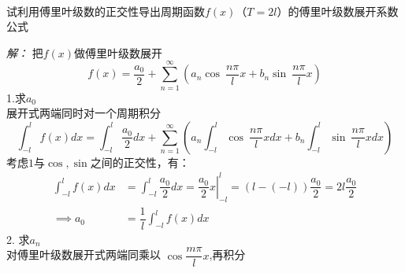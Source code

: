 ~~\\ 
\begin{example}
	试利用傅里叶级数的正交性导出周期函数$f(x)$（$T=2l$）的傅里叶级数展开系数公式
\end{example}
	\emph{解：}
    把$f(x)$做傅里叶级数展开
	$$ f(x) =\dfrac{a_0}{2} +\sum\limits_{n=1}^{\infty}  \left(  a_n \cos~ \dfrac{n\pi}{l} x +  b_n \sin~ \dfrac{n\pi}{l} x  \right) $$
	1.求$a_0$ \\
	展开式两端同时对一个周期积分
	$$ \int_{-l}^l  f(x) dx = \int_{-l}^l  \dfrac{a_0}{2} dx +\sum\limits_{n=1}^{\infty}  \left(  a_n \int_{-l}^l \cos~ \dfrac{n\pi}{l} x dx+  b_n \int_{-l}^l \sin~ \dfrac{n\pi}{l} x dx \right) $$
	考虑$1$与$\cos,\sin $之间的正交性，有：
$$\begin{aligned}
	\int_{-l}^l  f(x) dx &= \int_{-l}^l  \dfrac{a_0}{2} dx
=\left.\dfrac{a_0}{2}x\right|_{-l} ^l 
 =(l-(-l)) \dfrac{a_0}{2} 
 =2 l \dfrac{a_0}{2} \\
\implies a_0 & = \dfrac{1}{l} \int_{-l}^l f(x) dx 
\end{aligned}
$$
2. 求$a_n$\\ 对傅里叶级数展开式两端同乘以 $\cos \dfrac{m\pi}{l} x $,再积分

